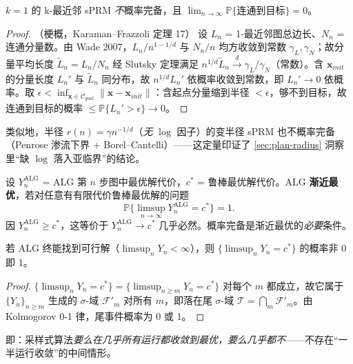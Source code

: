 \begin{theorem}\label{thm:plan-1nn}
$k=1$ 的 k-最近邻 sPRM \emph{不}概率完备，且 $\lim_{n\to\infty}\mathbb{P}\{\text{连通到目标}\}=0$。
\end{theorem}
\begin{proof}（梗概，Karaman--Frazzoli\cite{karaman2011sampling} 定理 17）
设 $L_n$ = 1-最近邻图总边长、$N_n$ = 连通分量数。由 Wade 2007，$L_n/n^{1-1/d}$ 与 $N_n/n$ 均方收敛到常数 $\gamma_L,\gamma_N$；故分量平均长度 $\widetilde L_n=L_n/N_n$ 经 Slutsky 定理满足 $n^{1/d}\widetilde L_n\xrightarrow{d}\gamma_L/\gamma_N$（常数）。含 $\mathbf{x}_{init}$ 的分量长度 $L_n'$ 与 $\widetilde L_n$ 同分布，故 $n^{1/d}L_n'$ 依概率收敛到常数，即 $L_n'\to0$ 依概率。取 $\epsilon<\inf_{\mathbf{x}\in\mathcal{C}_{goal}}\|\mathbf{x}-\mathbf{x}_{init}\|$：含起点分量缩到半径 $<\epsilon$，够不到目标，故连通到目标的概率 $\le\mathbb{P}\{L_n'>\epsilon\}\to0$。
\end{proof}

\noindent 类似地，半径 $r(n)=\gamma n^{-1/d}$（\emph{无} $\log$ 因子）的变半径 sPRM 也不概率完备（Penrose 渗流下界 + Borel--Cantelli）——这定量印证了 \cref{sec:plan-radius} 洞察里“缺 $\log$ 落入亚临界”的结论。

\begin{definition}[渐近最优性]\label{def:plan-ao}
设 $Y_n^{\mathrm{ALG}}$ = ALG 第 $n$ 步图中最优解代价，$c^*$ = 鲁棒最优解代价。ALG \textbf{渐近最优}，若对任意有有限代价鲁棒最优解的问题
\begin{equation}
  \mathbb{P}\Big\{\limsup_{n\to\infty}Y_n^{\mathrm{ALG}}=c^*\Big\}=1.
  \label{eq:plan-ao}
\end{equation}
因 $Y_n^{\mathrm{ALG}}\ge c^*$，这等价于 $Y_n^{\mathrm{ALG}}\to c^*$ 几乎必然。概率完备是渐近最优的\emph{必要}条件。
\end{definition}

\begin{theorem}[0-1 律]\label{thm:plan-01law}
若 ALG 终能找到可行解（$\limsup_n Y_n<\infty$），则 $\{\limsup_n Y_n=c^*\}$ 的概率非 0 即 1。
\end{theorem}
\begin{proof}
$\{\limsup_n Y_n=c^*\}=\{\limsup_{n\ge m}Y_n=c^*\}$ 对每个 $m$ 都成立，故它属于 $\{Y_n\}_{n\ge m}$ 生成的 $\sigma$-域 $\mathcal{F}'_m$ 对所有 $m$，即落在尾 $\sigma$-域 $\mathcal{T}=\bigcap_m\mathcal{F}'_m$。由 Kolmogorov 0-1 律，尾事件概率为 0 或 1。
\end{proof}
\noindent 即：采样式算法\emph{要么在几乎所有运行都收敛到最优，要么几乎都不}——不存在“一半运行收敛”的中间情形。

